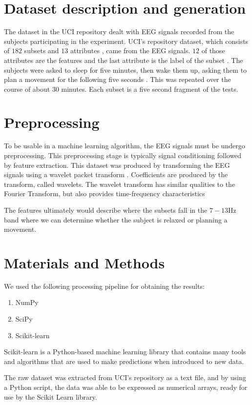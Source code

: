 \documentclass[conference,compsoc]{IEEEtran}
\begin{document}
\section{Dataset description and generation}
The dataset in the UCI repository dealt with EEG signals recorded from the subjects participating in the experiment.  UCI's repository dataset, which consists of $182$ subsets and $13$ attributes \cite{classsvm}, came from the EEG signals. $12$ of those attributes are the features and the last attribute is the label of the subset \cite{online}. 
The subjects were asked to sleep for five minutes, then wake them up, asking them to plan a movement for the following five seconds \cite{classsvm}. This was repeated over the course of about 30 minutes. Each subset is a five second fragment of the tests.

\section{Preprocessing}
To be usable in a machine learning algorithm, the EEG signals must be undergo preprocessing.  This preprocessing stage is typically signal conditioning followed by feature extraction.  This dataset was produced by transforming the EEG signals using a wavelet packet transform \cite{wavelet} . Coefficients are produced by the transform, called wavelets. The wavelet transform has similar qualities to the Fourier Transform, but also provides time-frequency characteristics%

The features ultimately would describe where the subsets fall in the $7-13\si{\hertz}$ band where we can determine whether the subject is relaxed or planning a movement.

\section{Materials and Methods}
We used the following processing pipeline for obtaining the results:
\begin{enumerate}
\item NumPy
\item SciPy
\item Scikit-learn
\end{enumerate}

Scikit-learn is a Python-based machine learning library \cite{scikit} that contains many tools and algorithms that are used to make predictions when introduced to new data. 

The raw dataset was extracted from UCI's repository as a text file, and by using a Python script, the data was able to be expressed as numerical arrays, ready for use by the Scikit Learn library. 
\end{document}
